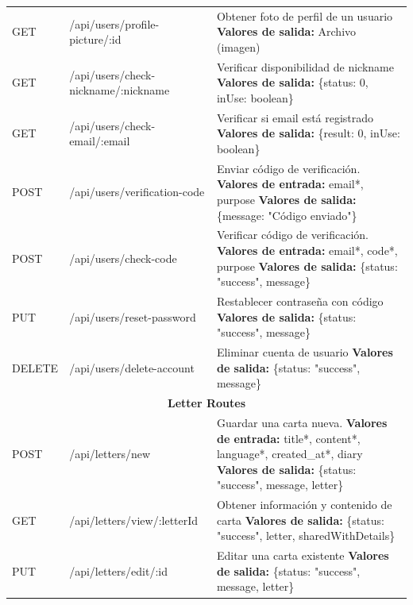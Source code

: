 \begin{longtable}{|l|p{5cm}|p{8cm}|}
GET & /api/users/profile-picture/:id & Obtener foto de perfil de un usuario \newline \textbf{Valores de salida:} Archivo (imagen) \\
GET & /api/users/check-nickname/:nickname & Verificar disponibilidad de nickname \newline \textbf{Valores de salida:} \{status: 0, inUse: boolean\} \\
GET & /api/users/check-email/:email & Verificar si email está registrado \newline \textbf{Valores de salida:} \{result: 0, inUse: boolean\} \\
POST & /api/users/verification-code & Enviar código de verificación. \newline \textbf{Valores de entrada:} email*, purpose \newline \textbf{Valores de salida:} \{message: "Código enviado"\} \\
POST & /api/users/check-code & Verificar código de verificación. \newline \textbf{Valores de entrada:} email*, code*, purpose \newline \textbf{Valores de salida:} \{status: "success", message\} \\
PUT & /api/users/reset-password & Restablecer contraseña con código \newline \textbf{Valores de salida:} \{status: "success", message\} \\
DELETE & /api/users/delete-account & Eliminar cuenta de usuario \newline \textbf{Valores de salida:} \{status: "success", message\} \\
\hline
\hline
\multicolumn{3}{|c|}{\textbf{Letter Routes}} \\
\hline
POST & /api/letters/new & Guardar una carta nueva. \newline \textbf{Valores de entrada:} title*, content*, language*, created\_at*, diary \newline \textbf{Valores de salida:} \{status: "success", message, letter\} \\
GET & /api/letters/view/:letterId & Obtener información y contenido de carta \newline \textbf{Valores de salida:} \{status: "success", letter, sharedWithDetails\} \\
PUT & /api/letters/edit/:id & Editar una carta existente \newline \textbf{Valores de salida:} \{status: "success", message, letter\} \\

\end{longtable}
